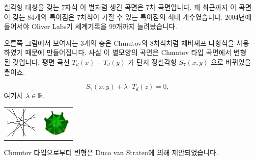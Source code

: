 \begin{surferPage}{칠각형 대칭을 갖는 $7$차식}
    이 별처럼 생긴 곡면은 $7$차 곡면입니다. 꽤 최근까지 이 곡면이 갖는 $84$개의 특이점은 $7$차식이 가질 수 있는 특이점의 최대 개수였습니다. $2004$년에 들어서야 Oliver Labs기 세계기록을 $99$개까지 늘려놨습니다.
  
  
오른쪽 그림에서 보여지는 $3$개의 층은 Chmutov의 $8$차식처럼 체비셰프 다항식을 사용하였기 때문에 만들어집니다. 사실 이 별모양의 곡면은 Chmutov 타입 곡면에서 변형된 것입니다. 평면 곡선 $T_d(x)+T_d(y)$ 가 단지 정칠각형 $S_7(x,y)$ 으로 바뀌었을 뿐이죠. 
   
   \[S_7(x,y) + \lambda \cdot T_d(z) = 0,\]
    여기서 $\lambda\in{\mathbb R}$. 
    \vspace*{-0.3em}
    \begin{center}
      \begin{tabular}{c@{\qquad}c}
        \includegraphics[height=1.5cm]{./../../common/images/labsseptic1.pdf}
        &
        \includegraphics[height=1.5cm]{./../../common/images/septic_7eck_von_oben}
      \end{tabular}
    \end{center}
    \vspace*{-0.3em}   
Chmutov 타입으로부터 변형은 Duco van Straten에 의해 제안되었습니다.
\end{surferPage}
